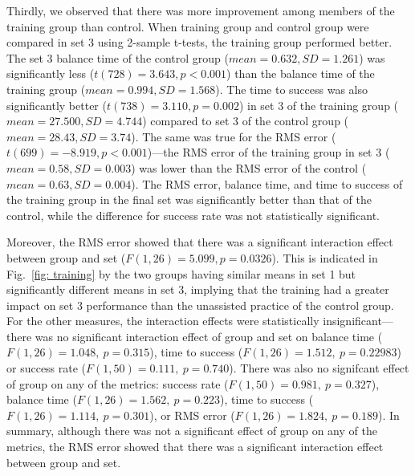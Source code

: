 \documentclass[12pt]{article}
\begin{document}
Thirdly, we observed that there was more improvement among members of the training group than control. When training group and control group were compared in set 3 using 2-sample t-tests, the training group performed better. The set 3 balance time of the control group ($mean =0.632, SD = 1.261$) was significantly less ($t(728)=3.643,p<0.001$) than the balance time of the training group ($mean = 0.994 , SD = 1.568$). The time to success was also significantly better ($t(738)=3.110, p=0.002$) in set 3 of the training group ($mean = 27.500, SD = 4.744$) compared to set 3 of the control group ($mean =28.43, SD = 3.74$). The same was true for the RMS error ($t(699)=-8.919,p<0.001$)---the RMS error of the training group in set 3 ($mean = 0.58, SD = 0.003$) was lower than the RMS error of the control ($mean = 0.63, SD = 0.004$). The RMS error, balance time, and time to success of the training group in the final set was significantly better than that of the control, while the difference for success rate was not statistically significant. 

Moreover, the RMS error showed that there was a significant interaction effect between group and set ($F(1,26)=5.099, p=0.0326$). This is indicated in Fig.~\ref{fig: training} by the two groups having similar means in set 1 but significantly different means in set 3, implying that the training had a greater impact on set 3 performance than the unassisted practice of the control group. For the other measures, the interaction effects were statistically insignificant---there was no significant interaction effect of group and set on balance time ($F(1,26)=1.048,\ p=0.315$), time to success ($F(1,26)=1.512,\ p=0.22983$) or success rate ($F(1,50)=0.111,\ p=0.740$). There was also no signifcant effect of group on any of the metrics: success rate ($F(1,50)=0.981,\ p=0.327$), balance time ($F(1,26)=1.562,\ p=0.223$), time to success ($F(1,26) = 1.114,\ p=0.301$), or RMS error ($F(1,26) = 1.824 ,\ p=0.189$). In summary, although there was not a significant effect of group on any of the  metrics, the RMS  error  showed  that there  was  a  significant  interaction  effect between  group  and set.  

\end{document}
